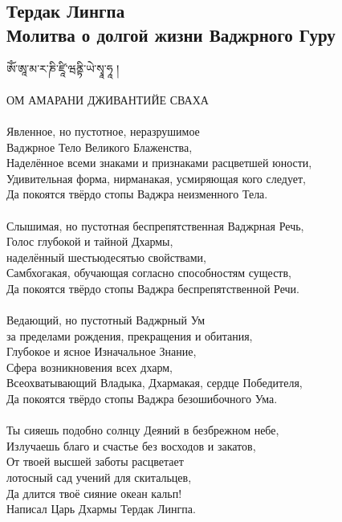 \subsection{Тердак Лингпа\\Молитва о долгой жизни Ваджрного Гуру}

\ti
ཨོཾ་ཨཱ་མ་ར་ཎི་ཛཱི་ཝནྟི་ཡེ་སྭཱ་ཧཱ ། \\
\\
\ru ОМ АМАРАНИ ДЖИВАНТИЙЕ СВАХА\\
\\
Явленное, но пустотное, неразрушимое \\ \indent Ваджрное Тело Великого Блаженства,\\
Наделённое всеми знаками и признаками расцветшей юности,\\
Удивительная форма, нирманакая, усмиряющая кого следует,\\
Да покоятся твёрдо стопы Ваджра неизменного Тела.\\
\\
Слышимая, но пустотная беспрепятственная Ваджрная Речь,\\
Голос глубокой и тайной Дхармы, \\ \indent наделённый шестьюдесятью свойствами,\\
Самбхогакая, обучающая согласно способностям существ,\\
Да покоятся твёрдо стопы Ваджра беспрепятственной Речи.\\
\\
Ведающий, но пустотный Ваджрный Ум \\ \indent за пределами рождения, прекращения и обитания,\\
Глубокое и ясное Изначальное Знание, \\ \indent Сфера возникновения всех дхарм,\\
Всеохватывающий Владыка, Дхармакая, сердце Победителя,\\
Да покоятся твёрдо стопы Ваджра безошибочного Ума.\\
\\
Ты сияешь подобно солнцу Деяний в безбрежном небе,\\
Излучаешь благо и счастье без восходов и закатов,\\
От твоей высшей заботы расцветает \\ \indent лотосный сад учений для скитальцев,\\
Да длится твоё сияние океан кальп!\\
\scriptsize
Написал Царь Дхармы Тердак Лингпа.
\normalsize
\newpage

